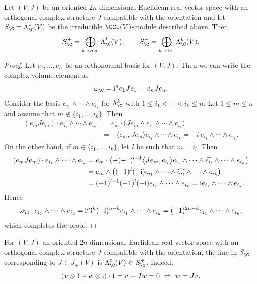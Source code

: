 \begin{Lemma}\label{plusmin}
Let $(V,J)$ be an oriented $2n$-dimensional Euclidean real vector space with an orthogonal complex structure $J$ compatible with the orientation and let $S_\C=\Lambda^*_\C(V)$ be the irreducible $\CCl(V)$-module described above. Then
\[
S_\C^+ = \bigoplus_{k \text{ even }} \Lambda_\C^k(V), \qquad S_\C^- = \bigoplus_{k \text{ odd }} \Lambda_\C^k(V).
\]
\end{Lemma}
\begin{proof}
Let $e_1, \ldots, e_n$ be an orthonormal basis for $(V,J)$. Then we can write the complex volume element as
\[
\omega_\C = {\rm i}^n e_1 Je_1 \cdots e_n Je_n .
\]
Consider the basis $e_{i_1} \wedge \cdots \wedge e_{i_k}$ for $\Lambda^k_{\C}$ with $1\leq i_1 < \cdots < i_k \leq n$. Let $1 \leq m \leq n$
and assume that $m \not \in \{i_1, \ldots, i_k \}$. Then
\[
\begin{aligned}
(e_m Je_m) \cdot e_{i_1} \wedge \cdots \wedge e_{i_k} & = e_m \cdot \big( Je_m \wedge e_{i_1} \wedge \cdots \wedge e_{i_k} \big) \\
& = -\big\langle e_m, Je_m \big\rangle e_{i_1} \wedge \cdots \wedge e_{i_k} = -i \ e_{i_1} \wedge \cdots \wedge e_{i_k}.
\end{aligned}
\]
On the other hand, if $m \in \{i_1, \ldots, i_k\}$, let $l$ be such that $m=i_l$. Then
\[
\begin{aligned}
(e_m Je_m) \cdot e_{i_1} \wedge \cdots \wedge e_{i_k} & = e_m \cdot \big( {-} (-1)^{l-1} \big\langle Je_m, e_{i_l} \big\rangle e_{i_1} \wedge \cdots \wedge \widehat{e_{i_l}} \wedge \cdots \wedge e_{i_k} \big)\\
& = e_m \wedge\big( (-1)^l (-{\rm i}) e_{i_1} \wedge \cdots \wedge \widehat{e_{i_l}} \wedge \cdots \wedge e_{i_k} \big) \\
& = (-1)^{l-1} (-1)^l(-{\rm i}) e_{i_1} \wedge \cdots \wedge e_{i_k} = {\rm i} e_{i_1} \wedge \cdots \wedge e_{i_k}.
\end{aligned}
\]
Hence
\[
\omega_\C \cdot e_{i_1} \wedge \cdots \wedge e_{i_k} = {\rm i}^n {\rm i}^k (-{\rm i})^{n-k} e_{i_1} \wedge \cdots \wedge e_{i_k} = (-1)^{2n-k} e_{i_1} \wedge \cdots \wedge e_{i_k},
\]
which completes the proof.
\end{proof}

\begin{Remark}
\label{lift}
For $(V,J)$ an oriented $2n$-dimensional Euclidean real vector space with an orthogonal complex structure $J$ compatible with the orientation, the line in $S^+_\C$ corresponding to $J\in J_+(V)$ is $\Lambda^0_\C(V)\subset S_\C^+$.
Indeed,
\[(v \otimes 1 + w \otimes {\rm i}) \cdot 1 = v+Jw = 0 \ \Leftrightarrow \ w=Jv. \]
\end{Remark}

